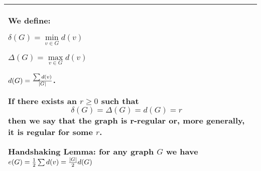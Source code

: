 \begin{tabularx}{\textwidth}{ X!{\color{git90gray}\vrule} X}
    We define:\smallskip
    
     $\delta(G)=\min\limits_{v\in G}d(v)$
    \smallskip

     $\Delta(G)=\max\limits_{v\in G}d(v)$
    \smallskip

     $d(G)={\sum d(v)\over |G|}$.
    \medskip

    If there exists an $r\geq 0$ such that
    $$\delta(G)=\Delta(G)=d(G)=r$$
    then we say that the graph is {\color{def}r-regular} or, more generally, it is {\color{acc}regular} for some $r$.
    \medskip


    \label{handshaking-lemma}
    {\color{def}Handshaking Lemma}: for any graph $G$ we have $e(G)=\frac12\sum d(v)={|G|\over2}d(G)$

    & \\

    \hline

\end{tabularx}



